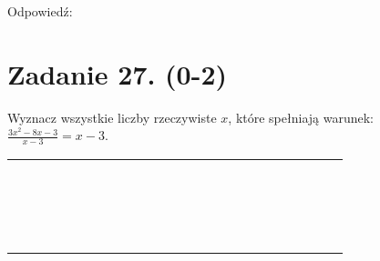 \documentclass[10pt]{article}
\begin{document}
Odpowiedź:

\section*{Zadanie 27. (0-2)}
Wyznacz wszystkie liczby rzeczywiste \(x\), które spełniają warunek: \(\frac{3 x^{2}-8 x-3}{x-3}=x-3\).

\begin{center}
\begin{tabular}{|c|c|c|c|c|c|c|c|c|c|c|c|c|c|c|c|c|c|c|c|c|c|c|}
\hline
 &  &  &  &  &  &  &  &  &  &  &  &  &  &  &  &  &  &  &  &  &  &  \\
\hline
 &  &  &  &  &  &  &  &  &  &  &  &  &  &  &  &  &  &  &  &  &  &  \\
\hline
 &  &  &  &  &  &  &  &  &  &  &  &  &  &  &  &  &  &  &  &  &  &  \\
\hline
 &  &  &  &  &  &  &  &  &  &  &  &  &  &  &  &  &  &  &  &  &  &  \\
\hline
 &  &  &  &  &  &  &  &  &  &  &  &  &  &  &  &  &  &  &  &  &  &  \\
\hline
 &  &  &  &  &  &  &  &  &  &  &  &  &  &  &  &  &  &  &  &  &  &  \\
\hline
 &  &  &  &  &  &  &  &  &  &  &  &  &  &  &  &  &  &  &  &  &  &  \\
\hline
 &  &  &  &  &  &  &  &  &  &  &  &  &  &  &  &  &  &  &  &  &  &  \\
\hline
 &  &  &  &  &  &  &  &  &  &  &  &  &  &  &  &  &  &  &  &  &  &  \\
\hline
 &  &  &  &  &  &  &  &  &  &  &  &  &  &  &  &  &  &  &  &  &  &  \\
\hline
 &  &  &  &  &  &  &  &  &  &  &  &  &  &  &  &  &  &  &  &  &  &  \\
\hline
 &  &  &  &  &  &  &  &  &  &  &  &  &  &  &  &  &  &  &  &  &  &  \\
\hline
 &  &  &  &  &  &  &  &  &  &  &  &  &  &  &  &  &  &  &  &  &  &  \\
\hline
 &  &  &  &  &  &  &  &  &  &  &  &  &  &  &  &  &  &  &  &  &  &  \\
\hline
 &  &  &  &  &  &  &  &  &  &  &  &  &  &  &  &  &  &  &  &  &  &  \\
\hline
 &  &  &  &  &  &  &  &  &  &  &  &  &  &  &  &  &  &  &  &  &  &  \\
\hline
 &  &  &  &  &  &  &  &  &  &  &  &  &  &  &  &  &  &  &  &  &  &  \\
\hline
 &  &  &  &  &  &  &  &  &  &  &  &  &  &  &  &  &  &  &  &  &  &  \\

\end{tabular}
\end{center}
\end{document}
